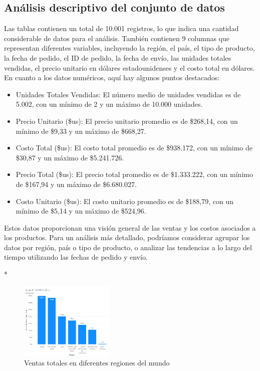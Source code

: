\documentclass[10pt]{article}
\begin{document}
\newpage
\begin{paracol}{2}
\section*{Análisis descriptivo del conjunto de datos}
Las tablas contienen un total de 10.001 registros, lo que indica una cantidad considerable de datos para el análisis. También contienen 9 columnas que representan diferentes variables, incluyendo la región, el país, el tipo de producto, la fecha de pedido, el ID de pedido, la fecha de envío, las unidades totales vendidas, el precio unitario en dólares estadounidenses y el costo total en dólares. En cuanto a los datos numéricos, aquí hay algunos puntos destacados:

\begin{itemize}
    \item Unidades Totales Vendidas: El número medio de unidades vendidas es de 5.002, con un mínimo de 2 y un máximo de 10.000 unidades.
    \item Precio Unitario (\$us): El precio unitario promedio es de \$268,14, con un mínimo de \$9,33 y un máximo de \$668,27.
    \item Costo Total (\$us): El costo total promedio es de \$938.172, con un mínimo de \$30,87 y un máximo de \$5.241.726.
    \item Precio Total (\$us): El precio total promedio es de \$1.333.222, con un mínimo de \$167,94 y un máximo de \$6.680.027.
    \item Costo Unitario (\$us): El costo unitario promedio es de \$188,79, con un mínimo de \$5,14 y un máximo de \$524,96.
\end{itemize}

Estos datos proporcionan una visión general de las ventas y los costos asociados a los productos. Para un análisis más detallado, podríamos considerar agrupar los datos por región, país o tipo de producto, o analizar las tendencias a lo largo del tiempo utilizando las fechas de pedido y envío.
\newpage

\switchcolumn[1]*{\noindent\scriptsize
    \begin{figure}
	\centering
	\includegraphics[width=0.4\textwidth]{../image/uno.png}
	\caption{Ventas totales en diferentes regiones del mundo}
    \end{figure}
}
\switchcolumn[0]\noindent


\end{paracol}
\end{document}
